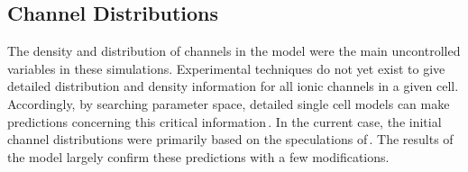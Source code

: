 \documentclass[12pt]{article}
\begin{document}
\subsection*{Channel Distributions}

The density and distribution of channels in the model were the main
uncontrolled variables in these simulations. Experimental
techniques do not yet exist to give detailed distribution and
density information for all ionic channels in a given cell.
Accordingly, by searching parameter space, detailed single cell
models can make predictions concerning this critical
information\,\cite{S:1993dz}. In the current case,
the initial channel distributions were primarily based on the
speculations of\,\cite{R:1980ly, R:1980pi}. The results
of the model largely confirm these predictions with a few
modifications.



\end{document}
